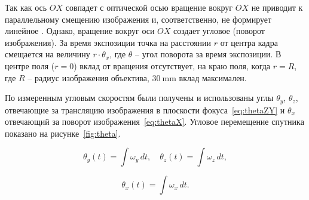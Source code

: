  Так как ось $OX$ совпадет с оптической осью  вращение вокруг $OX$ не приводит к параллельному смещению изображения и, соответственно, не формирует линейное . Однако, вращение вокруг оси $OX$ создает угловое  (поворот изображения). За время экспозиции точка на расстоянии $r$ от центра кадра смещается на величину $r\cdot \theta_x$, где $\theta$ -- угол поворота за время экспозиции. В центре поля ($r=0$) вклад от вращения отсутствует, на краю поля, когда $r=R$, где $R$ -- радиус изображения объектива, $\SI{30}{\milli\meter}$  вклад максимален.
 
 По измеренным угловым скоростям были получены и использованы углы $\theta_y$, $\theta_z$, отвечающие за трансляцию изображения в плоскости фокуса~\eqref{eq:thetaZY} и $\theta_x$ отвечающий за поворот изображения~\eqref{eq:thetaX}. Угловое перемещение спутника показано на рисунке~\cref{fig:theta}.
 
 \begin{equation}
 	\label{eq:thetaZY}
 	\theta_{y}(t)= \int \omega_{y}\, dt, \quad \theta_z(t) = \int \omega_z\,dt,
 \end{equation}
 
 \begin{equation}
 	\label{eq:thetaX}
 	\theta_{x}(t)= \int \omega_{x}\, dt. 
 \end{equation}
 
